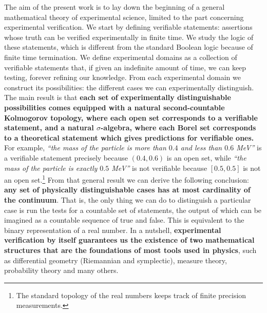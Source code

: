 \documentclass[%
reprint,
amsmath,amssymb,
aps,
prx,
]{revtex4-1}
\theoremstyle{plain}%
\theoremstyle{definition}
\theoremstyle{remark}
\newcommand{\statement}[1] {\emph{``#1''}}
\begin{document}
The aim of the present work is to lay down the beginning of a general mathematical theory of experimental science, limited to the part concerning experimental verification. We start by defining verifiable statements: assertions whose truth can be verified experimentally in finite time. We study the logic of these statements, which is different from the standard Boolean logic because of finite time termination. We define experimental domains as a collection of verifiable statements that, if given an indefinite amount of time, we can keep testing, forever refining our knowledge. From each experimental domain we construct its possibilities: the different cases we can experimentally distinguish. The main result is that \textbf{each set of experimentally distinguishable possibilities comes equipped with a natural second-countable Kolmogorov topology, where each open set corresponds to a verifiable statement, and a natural $\sigma$-algebra, where each Borel set corresponds to a theoretical statement which gives predictions for verifiable ones.} For example, \statement{the mass of the particle is more than $0.4$ and less than $0.6$ MeV} is a verifiable statement precisely because $(0.4, 0.6)$ is an open set, while \statement{the mass of the particle is exactly $0.5$ MeV} is not verifiable because $[0.5,0.5]$ is not an open set.\footnote{The standard topology of the real numbers keeps track of finite precision measurements.} From that general result we can derive the following conclusion: \textbf{any set of physically distinguishable cases has at most cardinality of the continuum}. That is, the only thing we can do to distinguish a particular case is run the tests for a countable set of statements, the output of which can be imagined as a countable sequence of true and false. This is equivalent to the binary representation of a real number. In a nutshell, \textbf{experimental verification by itself guarantees us the existence of two mathematical structures that are the foundations of most tools used in physics}, such as differential geometry (Riemannian and symplectic), measure theory, probability theory and many others.

\end{document}
